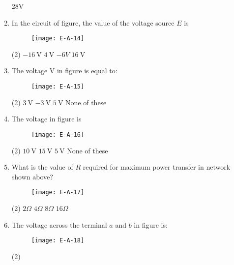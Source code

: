 \begin{enumerate}
\begin{tasks}
		\task[\textbf{d.}]28V
	\end{tasks}
	\item In the circuit of figure, the value of the voltage source $E$ is
	\begin{figure}[H]
		\centering
		\texttt{[image: E-A-14]}
		\caption{}
		\label{}
	\end{figure}
	 \begin{tasks}(2)
		\task[\textbf{a.}]$-16 \mathrm{~V}$
		\task[\textbf{b.}]$4 \mathrm{~V}$
		\task[\textbf{c.}] $-6 V$
		\task[\textbf{d.}]  $16 \mathrm{~V}$
	\end{tasks}
	\item The voltage $\mathrm{V}$ in figure is equal to:
	\begin{figure}[H]
		\centering
		\texttt{[image: E-A-15]}
		\caption{}
		\label{}
	\end{figure}
	 \begin{tasks}(2)
		\task[\textbf{a.}]$3 \mathrm{~V}$
		\task[\textbf{b.}]$-3 \mathrm{~V}$
		\task[\textbf{c.}]$5 \mathrm{~V}$
		\task[\textbf{d.}]None of these 
	\end{tasks}
	\item The voltage in figure is
	\begin{figure}[H]
		\centering
		\texttt{[image: E-A-16]}
		\caption{}
		\label{}
	\end{figure}
	 \begin{tasks}(2)
		\task[\textbf{a.}]$10 \mathrm{~V}$
		\task[\textbf{b.}]$15 \mathrm{~V}$
		\task[\textbf{c.}]$5 \mathrm{~V}$
		\task[\textbf{d.}]None of these 
	\end{tasks}
\item What is the value of $R$ required for maximum power transfer in network shown above?
\begin{figure}[H]
	\centering
	\texttt{[image: E-A-17]}
	\caption{}
	\label{}
\end{figure}
 \begin{tasks}(2)
	\task[\textbf{a.}]$2\Omega$
	\task[\textbf{b.}]$4\Omega$
	\task[\textbf{c.}]$8\Omega$
	\task[\textbf{d.}]$16\Omega$
\end{tasks}
\item The voltage across the terminal $a$ and $b$ in figure is:
\begin{figure}[H]
	\centering
	\texttt{[image: E-A-18]}
	\caption{}
	\label{}
\end{figure}
 \begin{tasks}(2)

\end{tasks}
\end{enumerate}
